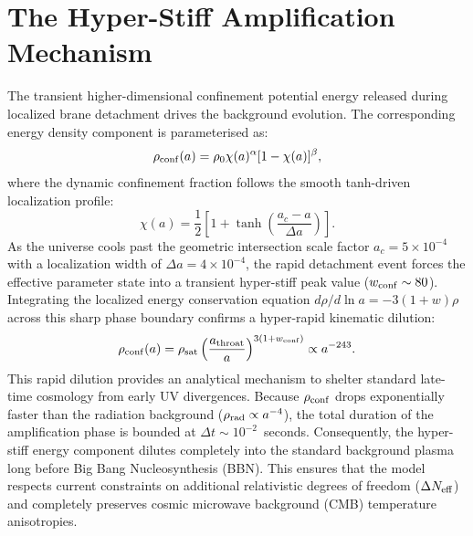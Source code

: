 \documentclass[twocolumn, PRD, amsmath, amssymb, aps, nofootinbib]{revtex4-2}
\begin{document}
\section{The Hyper-Stiff Amplification Mechanism}
The transient higher-dimensional confinement potential energy released during localized brane detachment drives the background evolution. The corresponding energy density component is parameterised as:
\begin{equation}
\rho_{\rm conf}(a) = \rho_0 \chi(a)^\alpha [1 - \chi(a)]^\beta,
\end{equation}
where the dynamic confinement fraction follows the smooth tanh-driven localization profile:
\begin{equation}
\chi(a) = \frac{1}{2}\left[ 1 + \tanh\left(\frac{a_c - a}{\Delta a}\right) \right].
\end{equation}
As the universe cools past the geometric intersection scale factor $a_c = 5 \times 10^{-4}$ with a localization width of $\Delta a = 4 \times 10^{-4}$, the rapid detachment event forces the effective parameter state into a transient hyper-stiff peak value ($w_{\rm conf} \sim 80$). Integrating the localized energy conservation equation $d\rho/d\ln a = -3(1+w)\rho$ across this sharp phase boundary confirms a hyper-rapid kinematic dilution:
\begin{equation}
\rho_{\rm conf}(a) = \rho_{\rm sat} \left(\frac{a_{\rm throat}}{a}\right)^{3(1+w_{\rm conf})} \propto a^{-243}.
\end{equation}
This rapid dilution provides an analytical mechanism to shelter standard late-time cosmology from early UV divergences. Because $\rho_{\rm conf}$ drops exponentially faster than the radiation background ($\rho_{\rm rad} \propto a^{-4}$), the total duration of the amplification phase is bounded at $\Delta t \sim 10^{-2}$~seconds. Consequently, the hyper-stiff energy component dilutes completely into the standard background plasma long before Big Bang Nucleosynthesis (BBN). This ensures that the model respects current constraints on additional relativistic degrees of freedom ($\Delta N_{\rm eff}$) and completely preserves cosmic microwave background (CMB) temperature anisotropies.
\end{document}
